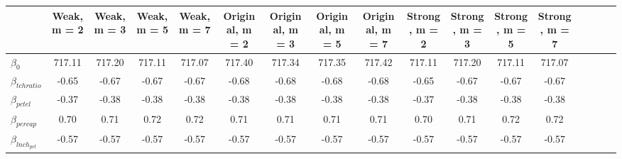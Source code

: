 \begin{tabular}{lcccccccccccccccc}
\toprule
 & Weak, m = 2 & Weak, m = 3 & Weak, m = 5 & Weak, m = 7 & Original, m = 2 & Original, m = 3 & Original, m = 5 & Original, m = 7 & Strong, m = 2 & Strong, m = 3 & Strong, m = 5 & Strong, m = 7 \\
\midrule
$\beta_0$ & 717.11 & 717.20 & 717.11 & 717.07 & 717.40 & 717.34 & 717.35 & 717.42 & 717.11 & 717.20 & 717.11 & 717.07 \\
$\beta_{tchratio}$ & -0.65 & -0.67 & -0.67 & -0.67 & -0.68 & -0.68 & -0.68 & -0.68 & -0.65 & -0.67 & -0.67 & -0.67 \\
$\beta_{pctel}$ & -0.37 & -0.38 & -0.38 & -0.38 & -0.38 & -0.38 & -0.38 & -0.38 & -0.37 & -0.38 & -0.38 & -0.38 \\
$\beta_{percap}$ & 0.70 & 0.71 & 0.72 & 0.72 & 0.71 & 0.71 & 0.71 & 0.71 & 0.70 & 0.71 & 0.72 & 0.72 \\
$\beta_{lnch_{pct}}$ & -0.57 & -0.57 & -0.57 & -0.57 & -0.57 & -0.57 & -0.57 & -0.57 & -0.57 & -0.57 & -0.57 & -0.57 \\
\bottomrule
\end{tabular}
